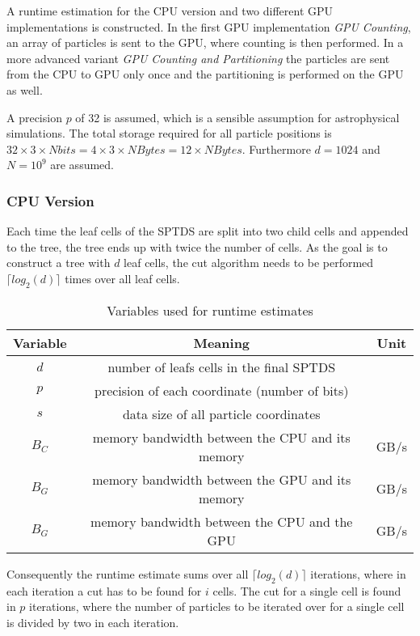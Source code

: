 \documentclass[]{article}
\begin{document}
A runtime estimation for the CPU version and two different GPU implementations is constructed. In the first GPU implementation \textit{GPU Counting}, an array of particles is sent to the GPU, where counting is then performed. In a more advanced variant \textit{GPU Counting and Partitioning} the particles are sent from the CPU to GPU only once and the partitioning is performed on the GPU as well.  

A precision $p$ of 32 is assumed, which is a sensible assumption for astrophysical simulations. The total storage required for all particle positions is $32 \times 3 \times N bits = 4 \times 3 \times N Bytes = 12 \times N Bytes$. Furthermore $d = 1024$ and $N=10^9$ are assumed.
 
\subsubsection{CPU Version}

Each time the leaf cells of the SPTDS are split into two child cells and appended to the tree, the tree ends up with twice the number of cells. As the goal is to construct a tree with $d$ leaf cells, the cut algorithm needs to be performed $\lceil log_2(d) \rceil$ times over all leaf cells. 

\small
\begin{table}[H]
	\begin{center}
		\begin{tabular}{@{} c | c | c }
			Variable & Meaning & Unit\\ 
			\hline
			$d$ & number of leafs cells in the final SPTDS \\
			$p$ & precision of each coordinate (number of bits) \\
			$s$ & data size of all particle coordinates \\
			$B_C$ & memory bandwidth between the CPU and its memory & GB/s \\
			$B_G$ & memory bandwidth between the GPU and its memory & GB/s \\
			$B_G$ &	memory bandwidth between the CPU and the GPU & GB/s \\
	
			
		\end{tabular}
	\end{center}
	\caption{Variables used for runtime estimates}
	\label{tab:runtime}
\end{table}

Consequently the runtime estimate sums over all $\lceil log_2(d) \rceil$ iterations, where in each iteration a cut has to be found for $i$ cells. The cut for a single cell is found in $p$ iterations, where the number of particles to be iterated over for a single cell is divided by two in each iteration. 
\end{document}
